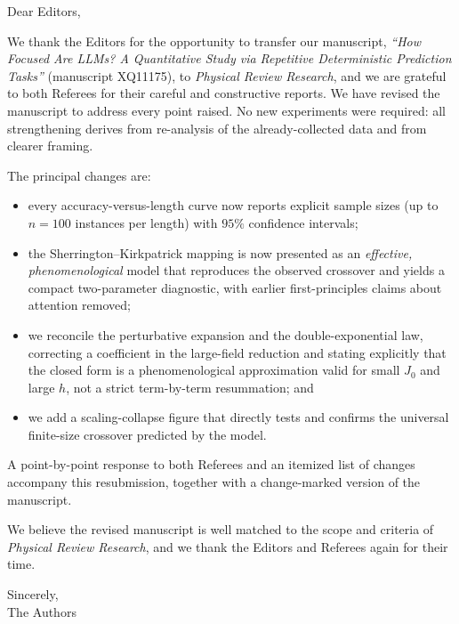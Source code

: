 \documentclass[11pt]{article}
\begin{document}
\noindent Dear Editors,

\bigskip

\noindent We thank the Editors for the opportunity to transfer our manuscript,
\textit{``How Focused Are LLMs? A Quantitative Study via Repetitive Deterministic
Prediction Tasks''} (manuscript XQ11175), to \textit{Physical Review Research}, and we
are grateful to both Referees for their careful and constructive reports. We have revised
the manuscript to address every point raised. No new experiments were required: all
strengthening derives from re-analysis of the already-collected data and from clearer
framing.

\medskip

\noindent The principal changes are:
\begin{itemize}
  \item every accuracy-versus-length curve now reports explicit sample sizes (up to
        $n=100$ instances per length) with $95\%$ confidence intervals;
  \item the Sherrington--Kirkpatrick mapping is now presented as an \emph{effective,
        phenomenological} model that reproduces the observed crossover and yields a compact
        two-parameter diagnostic, with earlier first-principles claims about attention removed;
  \item we reconcile the perturbative expansion and the double-exponential law, correcting a
        coefficient in the large-field reduction and stating explicitly that the closed form is
        a phenomenological approximation valid for small $J_0$ and large $h$, not a strict
        term-by-term resummation; and
  \item we add a scaling-collapse figure that directly tests and confirms the universal
        finite-size crossover predicted by the model.
\end{itemize}

\noindent A point-by-point response to both Referees and an itemized list of changes accompany
this resubmission, together with a change-marked version of the manuscript.

\medskip

\noindent We believe the revised manuscript is well matched to the scope and criteria of
\textit{Physical Review Research}, and we thank the Editors and Referees again for their time.

\bigskip

\noindent Sincerely,\\
The Authors
\end{document}
